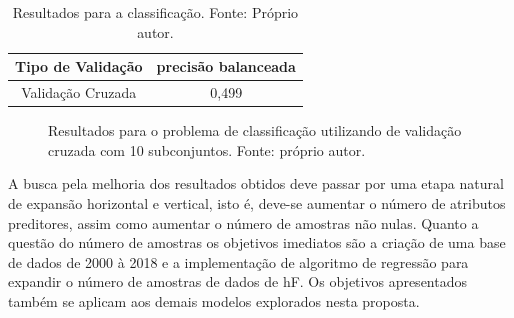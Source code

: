 \begin{table}[H]
\begin{center}
\begin{tabular}{|c|c|}
\hline
Tipo de Validação & precisão balanceada   \\ \hline
Validação Cruzada                   & 0,499   \\ \hline
\end{tabular}
\end{center}
\vspace{12pt}
\caption{Resultados para a classificação. Fonte: Próprio autor.}
\label{tab:results_all_class}
\end{table}

\begin{figure}[H]
\center
{}
\caption{Resultados para o problema de classificação utilizando de validação cruzada com 10 subconjuntos. Fonte: próprio autor.}
\label{fig:classallmik}
\end{figure}

A busca pela melhoria dos resultados obtidos deve passar por uma etapa natural de expansão horizontal e vertical, isto é, deve-se aumentar o número de atributos preditores, assim como aumentar o número de amostras não nulas. Quanto a questão do número de amostras os objetivos imediatos são a criação de uma base de dados de 2000 à 2018 e a implementação de algoritmo de regressão para expandir o número de amostras de dados de hF. Os objetivos apresentados também se aplicam aos demais modelos explorados nesta proposta.

